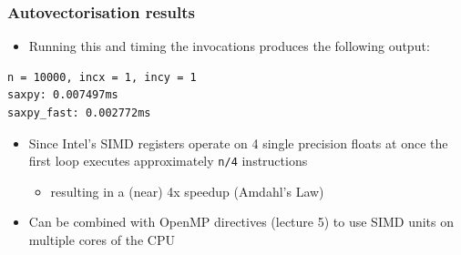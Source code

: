 \begin{Shaded}
\begin{Highlighting}[]

      
                 
     \NormalTok{)}
         \NormalTok{;}

      \NormalTok{) \{}
         \NormalTok{(} 
    \NormalTok{\}}
     \NormalTok{\{}
         \NormalTok{(} 
    \NormalTok{\}}

     \NormalTok{;}
\NormalTok{\}}
\end{Highlighting}
\end{Shaded}

\subsubsection{Autovectorisation
results}\label{autovectorisation-results}

\begin{itemize}
\itemsep1pt\parskip0pt
\item
  Running this and timing the invocations produces the following output:
\end{itemize}

\begin{verbatim}
n = 10000, incx = 1, incy = 1
saxpy: 0.007497ms
saxpy_fast: 0.002772ms
\end{verbatim}

\begin{itemize}
\itemsep1pt\parskip0pt
\item
  Since Intel's SIMD registers operate on 4 single precision floats at
  once the first loop executes approximately \texttt{n/4} instructions

  \begin{itemize}
  \itemsep1pt\parskip0pt
  \item
    resulting in a (near) 4x speedup (Amdahl's Law)
  \end{itemize}
\item
  Can be combined with OpenMP directives (lecture 5) to use SIMD units
  on multiple cores of the CPU
\end{itemize}

